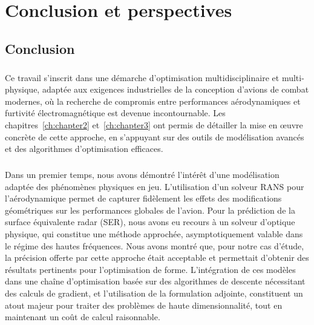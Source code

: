 \chapter{Conclusion et perspectives}
\label{ch:concl}



\section{Conclusion}

\paragraph{}
Ce travail s'inscrit dans une démarche d'optimisation multidisciplinaire et  multi-physique, adaptée aux exigences industrielles de la conception d'avions de combat modernes, où la recherche de compromis entre performances aérodynamiques et furtivité électromagnétique est devenue incontournable. Les chapitres~\ref{ch:chapter2} et~\ref{ch:chapter3} ont permis de détailler la mise en œuvre concrète de cette approche, en s'appuyant sur des outils de modélisation avancés et des algorithmes d'optimisation efficaces.

\paragraph{}
Dans un premier temps, nous avons démontré l'intérêt d'une modélisation adaptée des phénomènes physiques en jeu. L'utilisation d'un solveur RANS pour l'aérodynamique permet de capturer fidèlement les effets des modifications géométriques sur les performances globales de l'avion. Pour la prédiction de la surface équivalente radar (SER), nous avons eu recours à un solveur d'optique physique, qui constitue une méthode approchée, asymptotiquement valable dans le régime des hautes fréquences. Nous avons montré que, pour notre cas d'étude, la précision offerte par cette approche était acceptable et permettait d'obtenir des résultats pertinents pour l'optimisation de forme. L'intégration de ces modèles dans une chaîne d'optimisation basée sur des algorithmes de descente nécessitant des calculs de gradient, et l'utilisation de la formulation adjointe, constituent un atout majeur pour traiter des problèmes de haute dimensionnalité, tout en maintenant un coût de calcul raisonnable.

